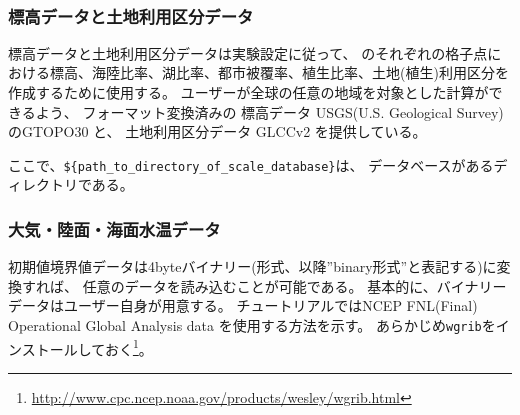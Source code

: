  \\


\subsubsection{標高データと土地利用区分データ}
標高データと土地利用区分データは実験設定に従って、
\scalerm のそれぞれの格子点における標高、海陸比率、湖比率、都市被覆率、植生比率、土地(植生)利用区分を
作成するために使用する。
ユーザーが全球の任意の地域を対象とした計算ができるよう、
フォーマット変換済みの
標高データ USGS(U.S. Geological Survey) のGTOPO30 と、
土地利用区分データ GLCCv2 を提供している。

ここで、\verb|${path_to_directory_of_scale_database}|は、
データベースがあるディレクトリである。

\subsubsection{大気・陸面・海面水温データ}
初期値境界値データは4byteバイナリー(\grads 形式、以降''binary形式''と表記する)に変換すれば、
任意のデータを読み込むことが可能である。
基本的に、バイナリーデータはユーザー自身が用意する。
チュートリアルではNCEP FNL(Final) Operational Global Analysis data を使用する方法を示す。
あらかじめ\verb|wgrib|をインストールしておく\footnote{\url{http://www.cpc.ncep.noaa.gov/products/wesley/wgrib.html}}。

